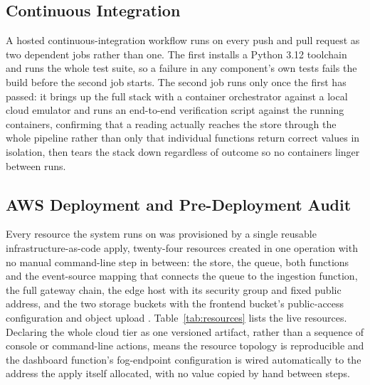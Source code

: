 \documentclass[conference]{IEEEtran}
\begin{document}
\subsection{Continuous Integration}

A hosted continuous-integration workflow \cite{ref16} runs on every push and pull request as two dependent jobs rather than one. The first installs a Python 3.12 toolchain and runs the whole test suite, so a failure in any component's own tests fails the build before the second job starts. The second job runs only once the first has passed: it brings up the full stack with a container orchestrator \cite{ref15} against a local cloud emulator and runs an end-to-end verification script against the running containers, confirming that a reading actually reaches the store through the whole pipeline rather than only that individual functions return correct values in isolation, then tears the stack down regardless of outcome so no containers linger between runs.

\subsection{AWS Deployment and Pre-Deployment Audit}

Every resource the system runs on was provisioned by a single reusable infrastructure-as-code apply, twenty-four resources created in one operation with no manual command-line step in between: the store, the queue, both functions and the event-source mapping that connects the queue to the ingestion function, the full gateway chain, the edge host with its security group and fixed public address, and the two storage buckets with the frontend bucket's public-access configuration and object upload \cite{ref10}. Table~\ref{tab:resources} lists the live resources. Declaring the whole cloud tier as one versioned artifact, rather than a sequence of console or command-line actions, means the resource topology is reproducible and the dashboard function's fog-endpoint configuration is wired automatically to the address the apply itself allocated, with no value copied by hand between steps.
\end{document}
